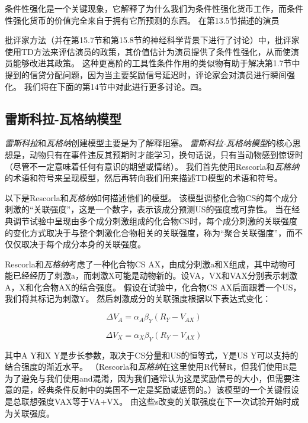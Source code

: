 条件性强化是一个关键现象，它解释了为什么我们为条件性强化货币工作，而条件性强化货币的价值完全来自于拥有它所预测的东西。
在第13.5节描述的演员{批评家方法（并在第15.7节和第15.8节的神经科学背景下进行了讨论）中，批评家使用TD方法来评估演员的政策，其价值估计为演员提供了条件性强化，从而使演员能够改进其政策。
这种更高阶的工具性条件作用的类似物有助于解决第1.7节中提到的信贷分配问题，因为当主要奖励信号延迟时，评论家会对演员进行瞬间强化。
我们将在下面的第14节中对此进行更多讨论。四。


\subsection{雷斯科拉-瓦格纳模型} \label{sec:rescorla_wagner}

\textit{雷斯科拉}和\textit{瓦格纳}创建模型主要是为了解释阻塞。
\textit{雷斯科拉-瓦格纳模型}的核心思想是，动物只有在事件违反其预期时才能学习，换句话说，只有当动物感到惊讶时（尽管不一定意味着任何有意识的期望或情绪）。
我们首先使用Rescorla和\textit{瓦格纳}的术语和符号来呈现模型，然后再转向我们用来描述TD模型的术语和符号。


以下是Rescorla和\textit{瓦格纳}如何描述他们的模型。
该模型调整化合物CS的每个成分刺激的“关联强度”，这是一个数字，表示该成分预测US的强度或可靠性。
当在经典调节试验中呈现由多个成分刺激组成的化合物CS时，每个成分刺激的关联强度的变化方式取决于与整个刺激化合物相关的关联强度，称为“聚合关联强度”，而不仅仅取决于每个成分本身的关联强度。


Rescorla和\textit{瓦格纳}考虑了一种化合物CS AX，由成分刺激a和X组成，其中动物可能已经经历了刺激a，而刺激X可能是动物新的。设VA，VX和VAX分别表示刺激A，X和化合物AX的结合强度。
假设在试验中，化合物CS AX后面跟着一个US，我们将其标记为刺激Y。
然后刺激成分的关联强度根据以下表达式变化：

\begin{equation}
	\Delta V_A = \alpha_A \beta_Y
		(R_Y - V_{AX})
\end{equation}


\begin{equation}
	\Delta V_X = 
		\alpha_X \beta_Y
		(R_Y - V_{AX})
\end{equation}

其中A Y和X Y是步长参数，取决于CS分量和US的恒等式，Y是US Y可以支持的结合强度的渐近水平。
（Rescorla和\textit{瓦格纳}在这里使用R代替R，但我们使用R是为了避免与我们使用and混淆，因为我们通常认为这是奖励信号的大小，但需要注意的是，经典条件反射中的美国不一定是奖励或惩罚的。）该模型的一个关键假设是总联想强度VAX等于VA+VX。
由这些s改变的关联强度在下一次试验开始时成为关联强度。


}

